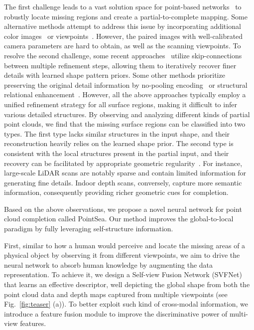 The first challenge leads to a vast solution space for point-based networks~\citep{yuan2018pcn,9928787,yu2021pointr,zhou2022seedformer} to robustly locate missing regions and create a partial-to-complete mapping.
Some alternative methods attempt to address this issue by incorporating additional color images~\citep{zhang2021view,aiello2022crossmodal,zhu2023csdn} or viewpoints~\citep{zhang2022shape,Gong_2021_ICCV,fu2023vapcnet}. 
However, the paired images with well-calibrated camera parameters are hard to obtain, as well as the scanning viewpoints.
To resolve the second challenge, some recent approaches~\citep{9928787,yan2022fbnet} utilize skip-connections between multiple refinement steps, allowing them to iteratively recover finer details with learned shape pattern priors. Some other methods prioritize preserving the original detail information by no-pooling encoding~\citep{zhou2022seedformer} or structural relational enhancement~\citep{10106495}.
However, all the above approaches typically employ a unified refinement strategy for all surface regions, making it difficult to infer various detailed structures. By observing and analyzing different kinds of partial point clouds, we find that the missing surface regions can be classified into two types.
The first type lacks similar structures in the input shape, and their reconstruction heavily relies on the learned shape prior.
The second type is consistent with the local structures present in the partial input, and their recovery can be facilitated by appropriate geometric regularity~\citep{zhao2021sign}. 
For instance, large-scale LiDAR scans are notably sparse and contain limited information for generating fine details. Indoor depth scans, conversely, capture more semantic information, consequently providing richer geometric cues for completion.

Based on the above observations, we propose a novel neural network for point cloud completion called PointSea.
Our method improves the global-to-local paradigm by fully leveraging self-structure information. 

First, similar to how a human would perceive and locate the missing areas of a physical object by observing it from different viewpoints, we aim to drive the neural network to absorb human knowledge by augmenting the data representation. To achieve it, we design a Self-view Fusion Network (SVFNet) that learns an effective descriptor, well depicting the global shape from both the point cloud data and depth maps captured from multiple viewpoints (see Fig.~\ref{fig:teaser} (a)). To better exploit such kind of cross-modal information, we introduce a feature fusion module to improve the discriminative power of multi-view features.

